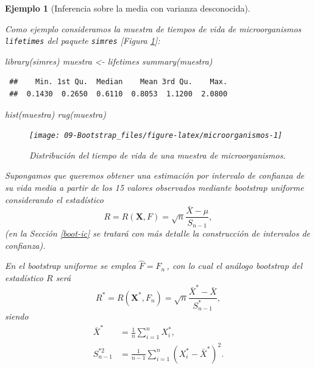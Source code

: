 \documentclass[
]{book}
\newenvironment{Shaded}{\begin{snugshade}}{\end{snugshade}}
\newcommand{\FunctionTok}[1]{\textcolor[rgb]{0.00,0.00,0.00}{#1}}
\newcommand{\NormalTok}[1]{#1}
\newcommand{\OtherTok}[1]{\textcolor[rgb]{0.56,0.35,0.01}{#1}}
\theoremstyle{break}
\newtheorem{example}{Ejemplo}[chapter]
\theoremstyle{nonumberplain}
\begin{document}
\begin{example}[Inferencia sobre la media con varianza desconocida]
\protect\hypertarget{exm:media-dt-desconocida}{}\label{exm:media-dt-desconocida}

Como ejemplo consideramos la muestra de tiempos de vida de microorganismos \texttt{lifetimes} del paquete \texttt{simres} {[}Figura \ref{fig:microorganismos}{]}:

\begin{Shaded}
\begin{Highlighting}[]
\FunctionTok{library}\NormalTok{(simres)}
\NormalTok{muestra }\OtherTok{\textless{}{-}}\NormalTok{ lifetimes}
\FunctionTok{summary}\NormalTok{(muestra)}
\end{Highlighting}
\end{Shaded}

\begin{verbatim}
 ##    Min. 1st Qu.  Median    Mean 3rd Qu.    Max. 
 ##  0.1430  0.2650  0.6110  0.8053  1.1200  2.0800
\end{verbatim}

\begin{Shaded}
\begin{Highlighting}[]
\FunctionTok{hist}\NormalTok{(muestra)}
\FunctionTok{rug}\NormalTok{(muestra)}
\end{Highlighting}
\end{Shaded}

\begin{figure}[!htb]

{\centering \texttt{[image: 09-Bootstrap\_files/figure-latex/microorganismos-1]} 

}

\caption{Distribución del tiempo de vida de una muestra de microorganismos.}\label{fig:microorganismos}
\end{figure}

Supongamos que queremos obtener una estimación por intervalo de confianza de su vida media a partir de los 15 valores observados mediante bootstrap uniforme considerando el estadístico
\[R=R\left( \mathbf{X},F \right) =\sqrt{n}\frac{\bar{X}-\mu }{S_{n-1}},\]
(en la Sección \ref{boot-ic} se tratará con más detalle la construcción de intervalos de confianza).

En el bootstrap uniforme se emplea \(\hat{F}=F_n\,\), con lo cual el análogo bootstrap del estadístico \(R\) será
\[R^{\ast}=R\left( \mathbf{X}^{\ast},F_n \right) =\sqrt{n}\frac{\bar{X}^{\ast}-\bar{X}}{S_{n-1}^{\ast}},\]
siendo
\[\begin{aligned}
\bar{X}^{\ast} &= \frac{1}{n}\sum_{i=1}^{n}X_i^{\ast}, \\
S_{n-1}^{\ast 2} &= \frac{1}{n-1}\sum_{i=1}^{n}\left( X_i^{\ast}-
\bar{X}^{\ast} \right)^2.
\end{aligned}\]


\end{example}
\end{document}
